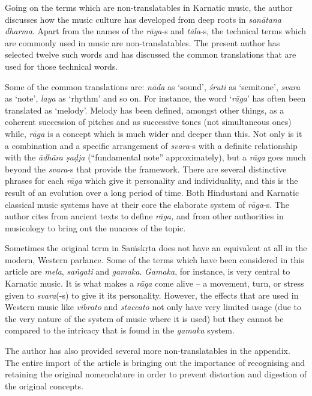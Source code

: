 Going on the terms which are non-translatables in Karnatic music, the author discusses how the music culture has developed from deep roots in \textit{sanātana dharma}. Apart from the names of the \textit{rāga}-s and \textit{tāla}-s, the technical terms which are commonly used in music are non-translatables. The present author has selected twelve such words and has discussed the common translations that are used for those technical words.

Some of the common translations are: \textit{nāda} as ‘sound’, \textit{śruti} as ‘semitone’, \textit{svara} as ‘note’, \textit{laya} as ‘rhythm’ and so on. For instance, the word ‘\textit{rāga}’ has often been translated as ‘melody’. Melody has been defined, amongst other things, as a coherent succession of pitches and as successive tones (not simultaneous ones) while, \textit{rāga} is a concept which is much wider and deeper than this. Not only is it a combination and a specific arrangement of \textit{svara}-s with a definite relationship with the \textit{ādhāra ṣaḍja} (“fundamental note” approximately), but a \textit{rāga} goes much beyond the \textit{svara}-s that provide the framework. There are several distinctive phrases for each \textit{rāga} which give it personality and individuality, and this is the result of an evolution over a long period of time. Both Hindustani and Karnatic classical music systems have at their core the elaborate system of \textit{rāga}-s. The author cites from ancient texts to define \textit{rāga,} and from other authorities in musicology to bring out the nuances of the topic.

Sometimes the original term in Saṁskṛta does not have an equivalent at all in the modern, Western parlance. Some of the terms which have been considered in this article are \textit{mela}, \textit{saṅgati} and \textit{gamaka}. \textit{Gamaka}, for instance, is very central to Karnatic music. It is what makes a \textit{rāga} come alive – a movement, turn, or stress given to \textit{svara}(-s) to give it its personality. However, the effects that are used in Western music like \textit{vibrato} and \textit{staccato} not only have very limited usage (due to the very nature of the system of music where it is used) but they cannot be compared to the intricacy that is found in the \textit{gamaka} system.

The author has also provided several more non-translatables in the appendix. The entire import of the article is bringing out the importance of recognising and retaining the original nomenclature in order to prevent distortion and digestion of the original concepts.

